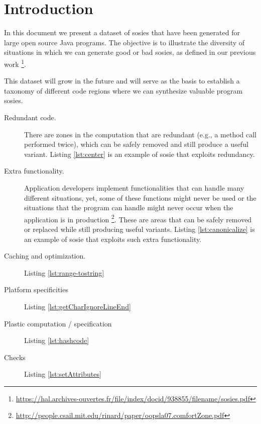 \section{Introduction}

In this document we present a dataset of sosies that have been generated for large open source Java programs. 
The objective is to illustrate the diversity of situations in which we can generate good or bad sosies, as defined in our previous work \footnote{\url{https://hal.archives-ouvertes.fr/file/index/docid/938855/filename/sosies.pdf}}. 

This dataset will grow in the future and will serve as the basis to establish a taxonomy of different code regions where we can synthesize valuable program sosies. 

\begin{description}
  \item [Redundant code.] There are zones in the computation that are redundant (e.g., a method call performed twice), which can be safely removed and still produce a useful variant. Listing  \ref{lst:center} is an example of sosie that exploits redundancy.
  \item [Extra functionality.] Application developers implement functionalities that can handle many different situations, yet, some of these functions might never be used or the situations that the program can handle might never occur when the application is in production \footnote{\url{http://people.csail.mit.edu/rinard/paper/oopsla07.comfortZone.pdf}}. These are areas that can be safely removed or replaced while still producing useful variants. Listing \ref{lst:canonicalize} is an example of sosie that exploits such extra functionality.
  \item [Caching and optimization.] Listing \ref{lst:range-tostring}
  \item [Platform specificities] Listing \ref{lst:getCharIgnoreLineEnd}
  \item [Plastic computation / specification] Listing \ref{lst:hashcode}
  \item [Checks] Listing \ref{lst:setAttributes}
\end{description}